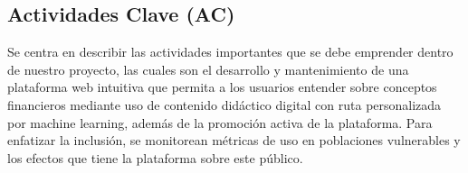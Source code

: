 {}
\subsection*{Actividades Clave (AC)}

Se centra en describir las actividades importantes que se debe emprender dentro de nuestro proyecto, las cuales son el desarrollo y mantenimiento de una plataforma web intuitiva que permita a los usuarios entender sobre conceptos financieros mediante uso de contenido didáctico digital con ruta personalizada por machine learning, además de la promoción activa de la plataforma. Para enfatizar la inclusión, se monitorean métricas de uso en poblaciones vulnerables y los efectos que tiene la plataforma sobre este público.